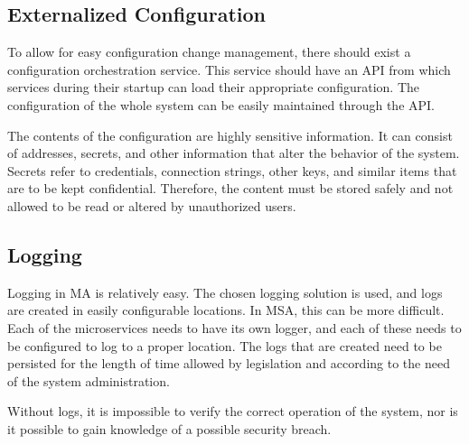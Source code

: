 \subsection{Externalized Configuration}
\begin{sloppypar}
    To allow for easy configuration change management, there should exist a
    configuration orchestration service. This service should have an API from
    which services during their startup can load their appropriate
    configuration. The configuration of the whole system can be easily
    maintained through the API.
\end{sloppypar}
\begin{sloppypar}
    The contents of the configuration are highly sensitive information. It can
    consist of addresses, secrets, and other information that alter the behavior
    of the system. Secrets refer to credentials, connection strings, other keys,
    and similar items that are to be kept confidential. Therefore, the content
    must be stored safely and not allowed to be read or altered by unauthorized
    users.
\end{sloppypar}

\subsection{Logging}
\begin{sloppypar}
    Logging in MA is relatively easy. The chosen logging solution is used, and
    logs are created in easily configurable locations. In MSA, this can be more
    difficult. Each of the microservices needs to have its own logger, and each
    of these needs to be configured to log to a proper location. The logs that
    are created need to be persisted for the length of time allowed by
    legislation and according to the need of the system administration.
\end{sloppypar}
\begin{sloppypar}
    Without logs, it is impossible to verify the correct operation of the
    system, nor is it possible to gain knowledge of a possible security breach. 
\end{sloppypar}

